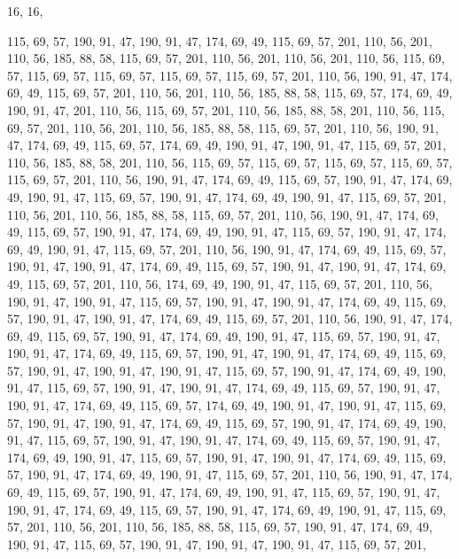 16, 16,

115, 69, 57, 190, 91, 47, 190, 91, 47, 174, 69, 49, 115, 69, 57, 201,
110, 56, 201, 110, 56, 185, 88, 58, 115, 69, 57, 201, 110, 56, 201, 110,
56, 201, 110, 56, 115, 69, 57, 115, 69, 57, 115, 69, 57, 115, 69, 57,
115, 69, 57, 201, 110, 56, 190, 91, 47, 174, 69, 49, 115, 69, 57, 201,
110, 56, 201, 110, 56, 185, 88, 58, 115, 69, 57, 174, 69, 49, 190, 91,
47, 201, 110, 56, 115, 69, 57, 201, 110, 56, 185, 88, 58, 201, 110, 56,
115, 69, 57, 201, 110, 56, 201, 110, 56, 185, 88, 58, 115, 69, 57, 201,
110, 56, 190, 91, 47, 174, 69, 49, 115, 69, 57, 174, 69, 49, 190, 91,
47, 190, 91, 47, 115, 69, 57, 201, 110, 56, 185, 88, 58, 201, 110, 56,
115, 69, 57, 115, 69, 57, 115, 69, 57, 115, 69, 57, 115, 69, 57, 201,
110, 56, 190, 91, 47, 174, 69, 49, 115, 69, 57, 190, 91, 47, 174, 69,
49, 190, 91, 47, 115, 69, 57, 190, 91, 47, 174, 69, 49, 190, 91, 47,
115, 69, 57, 201, 110, 56, 201, 110, 56, 185, 88, 58, 115, 69, 57, 201,
110, 56, 190, 91, 47, 174, 69, 49, 115, 69, 57, 190, 91, 47, 174, 69,
49, 190, 91, 47, 115, 69, 57, 190, 91, 47, 174, 69, 49, 190, 91, 47,
115, 69, 57, 201, 110, 56, 190, 91, 47, 174, 69, 49, 115, 69, 57, 190,
91, 47, 190, 91, 47, 174, 69, 49, 115, 69, 57, 190, 91, 47, 190, 91,
47, 174, 69, 49, 115, 69, 57, 201, 110, 56, 174, 69, 49, 190, 91, 47,
115, 69, 57, 201, 110, 56, 190, 91, 47, 190, 91, 47, 115, 69, 57, 190,
91, 47, 190, 91, 47, 174, 69, 49, 115, 69, 57, 190, 91, 47, 190, 91,
47, 174, 69, 49, 115, 69, 57, 201, 110, 56, 190, 91, 47, 174, 69, 49,
115, 69, 57, 190, 91, 47, 174, 69, 49, 190, 91, 47, 115, 69, 57, 190,
91, 47, 190, 91, 47, 174, 69, 49, 115, 69, 57, 190, 91, 47, 190, 91,
47, 174, 69, 49, 115, 69, 57, 190, 91, 47, 190, 91, 47, 190, 91, 47,
115, 69, 57, 190, 91, 47, 174, 69, 49, 190, 91, 47, 115, 69, 57, 190,
91, 47, 190, 91, 47, 174, 69, 49, 115, 69, 57, 190, 91, 47, 190, 91,
47, 174, 69, 49, 115, 69, 57, 174, 69, 49, 190, 91, 47, 190, 91, 47,
115, 69, 57, 190, 91, 47, 190, 91, 47, 174, 69, 49, 115, 69, 57, 190,
91, 47, 174, 69, 49, 190, 91, 47, 115, 69, 57, 190, 91, 47, 190, 91,
47, 174, 69, 49, 115, 69, 57, 190, 91, 47, 174, 69, 49, 190, 91, 47,
115, 69, 57, 190, 91, 47, 190, 91, 47, 174, 69, 49, 115, 69, 57, 190,
91, 47, 174, 69, 49, 190, 91, 47, 115, 69, 57, 201, 110, 56, 190, 91,
47, 174, 69, 49, 115, 69, 57, 190, 91, 47, 174, 69, 49, 190, 91, 47,
115, 69, 57, 190, 91, 47, 190, 91, 47, 174, 69, 49, 115, 69, 57, 190,
91, 47, 174, 69, 49, 190, 91, 47, 115, 69, 57, 201, 110, 56, 201, 110,
56, 185, 88, 58, 115, 69, 57, 190, 91, 47, 174, 69, 49, 190, 91, 47,
115, 69, 57, 190, 91, 47, 190, 91, 47, 190, 91, 47, 115, 69, 57, 201,
